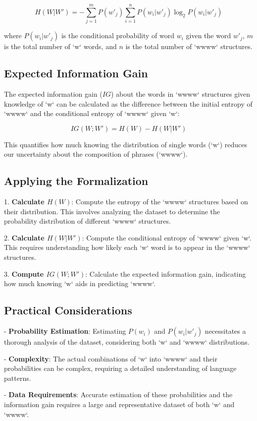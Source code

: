 \[
H(W|W') = -\sum_{j=1}^{m} P(w'_j) \sum_{i=1}^{n} P(w_i|w'_j) \log_2 P(w_i|w'_j)
\]

where \(P(w_i|w'_j)\) is the conditional probability of word \(w_i\) given the word \(w'_j\), \(m\) is the total number of `w` words, and \(n\) is the total number of `wwww` structures.

\subsection*{Expected Information Gain}

The expected information gain (\(IG\)) about the words in `wwww` structures given knowledge of `w` can be calculated as the difference between the initial entropy of `wwww` and the conditional entropy of `wwww` given `w`:

\[
IG(W;W') = H(W) - H(W|W')
\]

This quantifies how much knowing the distribution of single words (`w`) reduces our uncertainty about the composition of phrases (`wwww`).

\subsection*{Applying the Formalization}

1. \textbf{Calculate \(H(W)\)}: Compute the entropy of the `wwww` structures based on their distribution. This involves analyzing the dataset to determine the probability distribution of different `wwww` structures.

2. \textbf{Calculate \(H(W|W')\)}: Compute the conditional entropy of `wwww` given `w`. This requires understanding how likely each `w` word is to appear in the `wwww` structures.

3. \textbf{Compute \(IG(W;W')\)}: Calculate the expected information gain, indicating how much knowing `w` aids in predicting `wwww`.

\subsection*{Practical Considerations}

- \textbf{Probability Estimation}: Estimating \(P(w_i)\) and \(P(w_i|w'_j)\) necessitates a thorough analysis of the dataset, considering both `w` and `wwww` distributions.

- \textbf{Complexity}: The actual combinations of `w` into `wwww` and their probabilities can be complex, requiring a detailed understanding of language patterns.

- \textbf{Data Requirements}: Accurate estimation of these probabilities and the information gain requires a large and representative dataset of both `w` and `wwww`.
